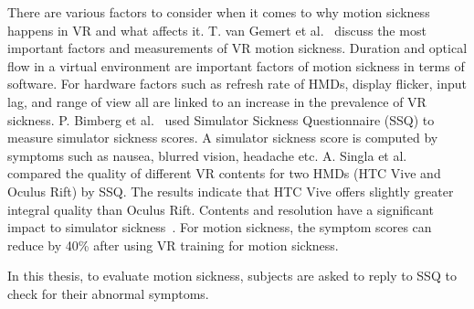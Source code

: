 There are various factors to consider when it comes to why motion sickness happens in VR and what affects it. T. van Gemert et al.~\cite{9419312} discuss the most important factors and measurements of VR motion sickness. Duration and optical flow in a virtual environment are important factors of motion sickness in terms of software. For hardware factors such as refresh rate of HMDs, display flicker, input lag, and range of view all are linked to an increase in the prevalence of VR sickness. P. Bimberg et al.~\cite{9090573} used Simulator Sickness Questionnaire (SSQ) to measure simulator sickness scores. A simulator sickness score is computed by symptoms such as nausea, blurred vision, headache etc.
A. Singla et al.~\cite{7965658} compared the quality of different VR contents for two HMDs (HTC Vive and Oculus Rift) by SSQ. The results indicate that HTC Vive offers slightly greater integral quality than Oculus Rift. Contents and resolution have a significant impact to simulator sickness~\cite{o2021preventing}. For motion sickness, the symptom scores can reduce by 40\% after using  VR training for motion sickness.

In this thesis, to evaluate motion sickness, subjects are asked to reply to SSQ to check for their abnormal symptoms.


 
 